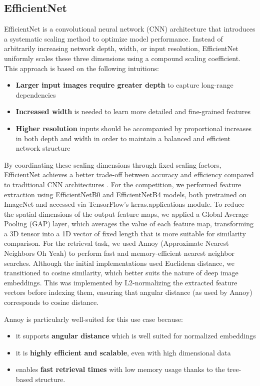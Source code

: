 \subsection{EfficientNet}

EfficientNet is a convolutional neural network (CNN) architecture that introduces a systematic scaling method to optimize model performance. 
Instead of arbitrarily increasing network depth, width, or input resolution, EfficientNet uniformly scales these three dimensions using a compound scaling coefficient. 
This approach is based on the following intuitions:
\begin{itemize}
\item {\bf Larger input images require greater depth} to capture long-range dependencies 
\item {\bf Increased width} is needed to learn more detailed and fine-grained features 
\item {\bf Higher resolution} inputs should be accompanied by proportional increases in both depth and width in order to maintain a balanced and efficient network structure
\end{itemize}

By coordinating these scaling dimensions through fixed scaling factors, EfficientNet achieves a better trade-off between accuracy and efficiency compared to traditional CNN architectures \cite{tan2019efficientnet}.
For the competition, we performed feature extraction using EfficientNetB0 and EfficientNetB4 models, both pretrained on ImageNet and accessed via TensorFlow's keras.applications module. 
To reduce the spatial dimensions of the output feature maps, we applied a Global Average Pooling (GAP) layer, which averages the value of each feature map, transforming a 3D tensor into a 1D vector of fixed length that is more suitable for similarity comparison. 
For the retrieval task, we used Annoy (Approximate Nearest Neighbors Oh Yeah) to perform fast and memory-efficient nearest neighbor searches. Although the initial implementations used Euclidean distance, we transitioned to cosine similarity, which better suits the nature of deep image embeddings. This was implemented by L2-normalizing the extracted feature vectors before indexing them, ensuring that angular distance (as used by Annoy) corresponds to cosine distance.

Annoy is particularly well-suited for this use case because:
\begin{itemize}
\item it supports {\bf angular distance} which is well suited for normalized embeddings 
\item it is {\bf highly efficient and scalable}, even with high dimensional data 
\item enables {\bf fast retrieval times} with low memory usage thanks to the tree-based structure. 
\end{itemize}


